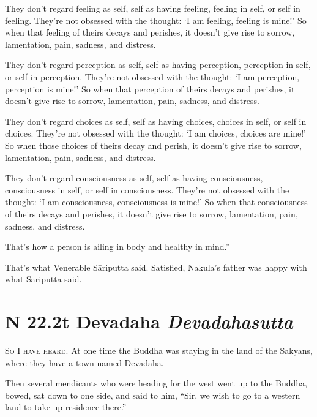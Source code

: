 \documentclass[12pt,openany]{book}%
\newcommand*{\suttatitleacronym}[1]{\smaller[2]{#1}\vspace*{.3em}}
\newcommand*{\suttatitletranslation}[1]{\linebreak{#1}}
\newcommand*{\suttatitleroot}[1]{\linebreak\smaller[2]\itshape{#1}}
\newcommand*{\tocacronym}[1]{\hspace*{-3.3em}{#1}\quad}
\newcommand*{\toctranslation}[1]{#1}
\newcommand*{\tocroot}[1]{(\textit{#1})}
\newcommand*{\scevam}[1]{\textsc{#1}}
\begin{document}
They don’t regard feeling as self, self as having feeling, feeling in self, or self in feeling. They’re not obsessed with the thought: ‘I am feeling, feeling is mine!’ So when that feeling of theirs decays and perishes, it doesn’t give rise to sorrow, lamentation, pain, sadness, and distress. 

They don’t regard perception as self, self as having perception, perception in self, or self in perception. They’re not obsessed with the thought: ‘I am perception, perception is mine!’ So when that perception of theirs decays and perishes, it doesn’t give rise to sorrow, lamentation, pain, sadness, and distress. 

They don’t regard choices as self, self as having choices, choices in self, or self in choices. They’re not obsessed with the thought: ‘I am choices, choices are mine!’ So when those choices of theirs decay and perish, it doesn’t give rise to sorrow, lamentation, pain, sadness, and distress. 

They don’t regard consciousness as self, self as having consciousness, consciousness in self, or self in consciousness. They’re not obsessed with the thought: ‘I am consciousness, consciousness is mine!’ So when that consciousness of theirs decays and perishes, it doesn’t give rise to sorrow, lamentation, pain, sadness, and distress. 

That’s how a person is ailing in body and healthy in mind.” 

That’s what Venerable \textsanskrit{Sāriputta} said. Satisfied, Nakula’s father was happy with what \textsanskrit{Sāriputta} said. 

%
\section*{{\suttatitleacronym SN 22.2}{\suttatitletranslation At Devadaha }{\suttatitleroot Devadahasutta}}
\addcontentsline{toc}{section}{\tocacronym{SN 22.2} \toctranslation{At Devadaha } \tocroot{Devadahasutta}}

\scevam{So I have heard. }At one time the Buddha was staying in the land of the Sakyans, where they have a town named Devadaha. 

Then several mendicants who were heading for the west went up to the Buddha, bowed, sat down to one side, and said to him, “Sir, we wish to go to a western land to take up residence there.” 
\end{document}
